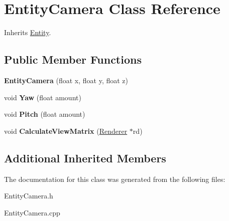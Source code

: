 \hypertarget{class_entity_camera}{\section{Entity\-Camera Class Reference}
\label{class_entity_camera}
}


Inherits \hyperlink{class_entity}{Entity}.

\subsection*{Public Member Functions}
\begin{DoxyCompactItemize}
\item 
\hypertarget{class_entity_camera_a9620e1ede6338a896b982d9ed1cf155b}{{\bfseries Entity\-Camera} (float x, float y, float z)}\label{class_entity_camera_a9620e1ede6338a896b982d9ed1cf155b}

\item 
\hypertarget{class_entity_camera_a75f42dcfab9134b75c8a91b186150a16}{void {\bfseries Yaw} (float amount)}\label{class_entity_camera_a75f42dcfab9134b75c8a91b186150a16}

\item 
\hypertarget{class_entity_camera_aff86ba52b41bf1897917442d7d3c5d41}{void {\bfseries Pitch} (float amount)}\label{class_entity_camera_aff86ba52b41bf1897917442d7d3c5d41}

\item 
\hypertarget{class_entity_camera_afb10b4b5da5b9311129422613000c07c}{void {\bfseries Calculate\-View\-Matrix} (\hyperlink{class_renderer}{Renderer} $\ast$rd)}\label{class_entity_camera_afb10b4b5da5b9311129422613000c07c}

\end{DoxyCompactItemize}
\subsection*{Additional Inherited Members}


The documentation for this class was generated from the following files\-:\begin{DoxyCompactItemize}
\item 
Entity\-Camera.\-h\item 
Entity\-Camera.\-cpp\end{DoxyCompactItemize}

